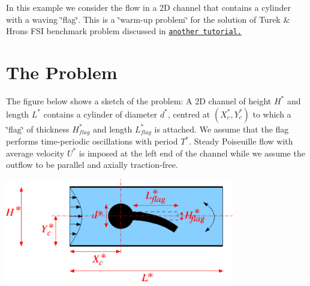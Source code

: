 In this example we consider the flow in a 2D channel that contains a cylinder with a waving \char`\"{}flag\char`\"{}. This is a \char`\"{}warm-\/up problem\char`\"{} for the solution of Turek \& Hron\textquotesingle{}s F\+SI benchmark problem discussed in \href{../../../interaction/turek_flag/html/index.html}{\tt another tutorial.}



 

\hypertarget{index_the_problem}{}\section{The Problem}\label{index_the_problem}
The figure below shows a sketch of the problem\+: A 2D channel of height $ H^*$ and length $ L^* $ contains a cylinder of diameter $ d^* $, centred at $ (X^*_c, Y^*_c) $ to which a \char`\"{}flag\char`\"{} of thickness $ H^*_{flag}$ and length $ L^*_{flag} $ is attached. We assume that the flag performs time-\/periodic oscillations with period $ T^*. $ Steady Poiseuille flow with average velocity $ U^* $ is imposed at the left end of the channel while we assume the outflow to be parallel and axially traction-\/free.

 
\begin{DoxyImage}
\includegraphics[width=0.75\textwidth]{turek_flag_non_fsi_dim}
\end{DoxyImage}



